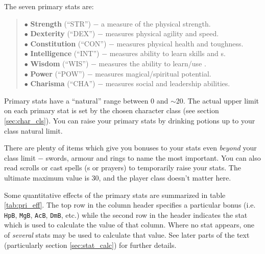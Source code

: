 The seven primary stats are:
{\small
\begin{quote} 
$\bullet$ {\bf Strength} (``STR'') $-$ 
a measure of the physical strength. \\
$\bullet$ {\bf Dexterity} (``DEX'') $-$
measures physical agility and speed. \\
$\bullet$ {\bf Constitution} (``CON'') $-$
measures physical health and toughness. \\
$\bullet$ {\bf Intelligence} (``INT'') $-$ 
measures ability to learn skills and \incantation s. \\ 
$\bullet$ {\bf Wisdom} (``WIS'') $-$ 
measures the ability to learn/use \divinemagic . \\
$\bullet$ {\bf Power} (``POW'') $-$ 
measures magical/spiritual potential. \\
$\bullet$ {\bf Charisma} (``CHA'') $-$ 
measures social and leadership abilities. 
\end{quote}
}
Primary stats have a ``natural'' range 
between 0 and $\sim$20. The actual upper limit on each primary stat is 
set by the chosen character class (see section \ref{sec:char_cls}). You 
can raise your primary stats by drinking potions up to 
your class natural limit.

There are plenty of items which give you bonuses to your 
stats even {\em beyond} your class limit $-$ swords, 
armour and rings to 
name the most important. You can also read scrolls or cast 
spells (\incantation s
or prayers) to temporarily raise your stats.  The ultimate maximum value is 30, 
and the player class doesn't matter here. 

Some quantitative effects of the primary stats are summarized in table 
\ref{tab:pri_eff}. The top row in the column header specifies a particular
bonus (i.e. {\tt HpB}, {\tt MgB}, {\tt AcB}, {\tt DmB}, etc.) while the second row 
in the header indicates the stat which is used to calculate the value of 
that column. Where no stat appears, one of {\em several} stats may be 
used to calculate that value. See later parts of the text (particularly
section \ref{sec:stat_calc}) for further details. 

